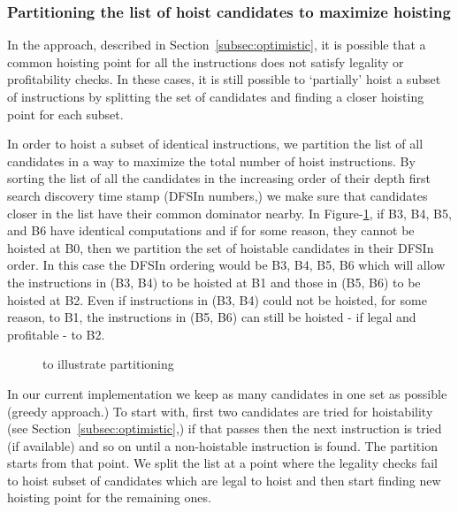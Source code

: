 \documentclass[sigplan,10pt,review,anonymous]{acmart}\settopmatter{printfolios=true,printccs=false,printacmref=false}
\begin{document}
\subsubsection{Partitioning the list of hoist candidates to maximize hoisting}
\label{subsec:partition}
In the approach, described in Section~\ref{subsec:optimistic}, it is possible
that a common hoisting point for all the instructions does not satisfy legality
or profitability checks. In these cases, it is still possible to `partially'
hoist a subset of instructions by splitting the set of candidates and finding a
closer hoisting point for each subset.

In order to hoist a subset of identical instructions, we partition the list of
all candidates in a way to maximize the total number of hoist instructions.  By
sorting the list of all the candidates in the increasing order of their depth
first search discovery time stamp \cite{clrs} (DFSIn numbers,) we make sure that
candidates closer in the list have their common dominator nearby. In
Figure-\ref{fig:dfsin}, if B3, B4, B5, and B6 have identical computations and if
for some reason, they cannot be hoisted at B0, then we partition the set of
hoistable candidates in their DFSIn order. In this case the DFSIn ordering would
be B3, B4, B5, B6 which will allow the instructions in (B3, B4) to be hoisted at
B1 and those in (B5, B6) to be hoisted at B2. Even if instructions in (B3, B4)
could not be hoisted, for some reason, to B1, the instructions in (B5, B6) can
still be hoisted - if legal and profitable - to B2.

\begin{figure}
\centering
\caption{\CFG{} to illustrate partitioning}
\label{fig:dfsin}
\end{figure}

In our current implementation we keep as many candidates in one set as possible
(greedy approach.) To start with, first two candidates are tried for
hoistability (see Section~\ref{subsec:optimistic},) if that passes then the next
instruction is tried (if available) and so on until a non-hoistable instruction
is found. The partition starts from that point.  We split the list at a point
where the legality checks fail to hoist subset of candidates which are legal to
hoist and then start finding new hoisting point for the remaining ones.
\end{document}
